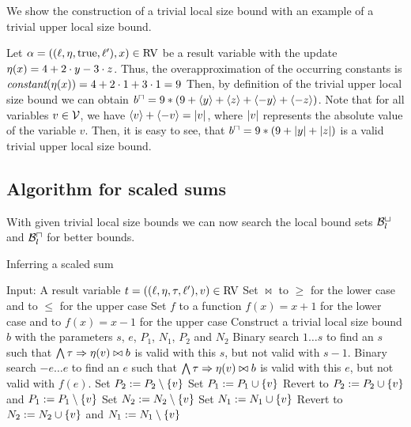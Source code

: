 

We show the construction of a trivial local size bound with an example of a trivial upper local size bound.

\begin{example}
  Let $\alpha = ((\ell,\eta,\text{true},\ell'),x) \in \text{RV}$ be a result variable with the update $\eta(x) = 4 + 2 \cdot y - 3 \cdot z$.
  Thus, the overapproximation of the occurring constants is $\emph{constant}(\eta(x)) = 4 + 2 \cdot 1 + 3 \cdot 1 = 9$
  Then, by definition of the trivial upper local size bound we can obtain $b^\sqcap = 9 * (9 + \langle y\rangle + \langle z\rangle + \langle-y\rangle + \langle-z\rangle)$.
  Note that for all variables $v \in \mathcal{V}$, we have $\langle v\rangle + \langle-v\rangle = \left|v\right|$, where $\left|v\right|$ represents the absolute value of the variable $v$.
  Then, it is easy to see, that $b^\sqcap = 9 * (9 + \left|y\right| + \left|z\right|)$ is a valid trivial upper local size bound.
\end{example}

\subsection{Algorithm for scaled sums}

With given trivial local size bounds we can now search the local bound sets $\mathcal{B}^\sqcup_l$ and $\mathcal{B}^\sqcap_l$ for better bounds.

\begin{algorithm}
\caption{Inferring a scaled sum}\label{ulsb_algorithm}
\begin{algorithmic}[1]
  \State Input: A result variable $t = ((\ell,\eta,\tau,\ell'),v) \in \text{RV}$
  \State Set $\bowtie$ to $\geq$ for the lower case and to $\leq$ for the upper case
  \State Set $f$ to a function $f(x)=x+1$ for the lower case and to $f(x)=x-1$ for the upper case
  \State Construct a trivial local size bound $b$ with the parameters $s$, $e$, $P_1$, $N_1$, $P_2$ and $N_2$
  \State Binary search $1 \dots s$ to find an $s$ such that $\bigwedge \tau \Rightarrow \eta(v) \bowtie b$ is valid with this $s$, but not valid with $s-1$.
  \State Binary search $-e \dots e$ to find an $e$ such that $\bigwedge \tau \Rightarrow \eta(v) \bowtie b$ is valid with this $e$, but not valid with $f(e)$.
    \State Set $P_2 := P_2 \setminus \lbrace v \rbrace$
      \State Set $P_1 := P_1 \cup \lbrace v \rbrace$
        \State Revert to $P_2 := P_2 \cup \lbrace v \rbrace$ and $P_1 := P_1 \setminus \lbrace v \rbrace$
      \EndIf
    \EndIf
    \State Set $N_2 := N_2 \setminus \lbrace v \rbrace$
      \State Set $N_1 := N_1 \cup \lbrace v \rbrace$
        \State Revert to $N_2 := N_2 \cup \lbrace v \rbrace$ and $N_1 := N_1 \setminus \lbrace v \rbrace$
      \EndIf
    \EndIf
  \EndFor
\end{algorithmic}
\end{algorithm}

